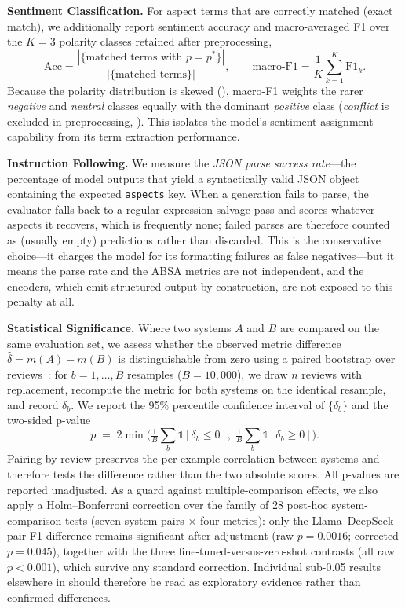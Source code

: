 \documentclass[bdcc,article,submit,moreauthors]{Definitions/mdpi}
\newcommand{\ind}{\mathds{1}} %
\begin{document}
\textbf{Sentiment Classification.} For aspect terms that are correctly matched (exact match), we additionally report sentiment accuracy and macro-averaged F1 over the $K{=}3$ polarity classes retained after preprocessing,
\begin{equation}
\label{eq:macrof1}
\mathrm{Acc} = \frac{|\{\text{matched terms with } p = p^{*}\}|}{|\{\text{matched terms}\}|},
\qquad
\text{macro-F1} = \frac{1}{K} \sum_{k=1}^{K} \mathrm{F1}_k .
\end{equation}
Because the polarity distribution is skewed (), macro-F1 weights the rarer \textit{negative} and \textit{neutral} classes equally with the dominant \textit{positive} class (\textit{conflict} is excluded in preprocessing, ). This isolates the model's sentiment assignment capability from its term extraction performance.

\textbf{Instruction Following.} We measure the \emph{JSON parse success rate}---the percentage of model outputs that yield a syntactically valid JSON object containing the expected \texttt{aspects} key. When a generation fails to parse, the evaluator falls back to a regular-expression salvage pass and scores whatever aspects it recovers, which is frequently none; failed parses are therefore counted as (usually empty) predictions rather than discarded. This is the conservative choice---it charges the model for its formatting failures as false negatives---but it means the parse rate and the ABSA metrics are not independent, and the encoders, which emit structured output by construction, are not exposed to this penalty at all.

\textbf{Statistical Significance.} Where two systems $A$ and $B$ are compared on the same evaluation set, we assess whether the observed metric difference $\hat{\delta} = m(A) - m(B)$ is distinguishable from zero using a paired bootstrap over reviews~\cite{koehn-2004-statistical}: for $b = 1, \dots, B$ resamples ($B = 10{,}000$), we draw $n$ reviews with replacement, recompute the metric for both systems on the identical resample, and record $\delta_b$. We report the 95\% percentile confidence interval of $\{\delta_b\}$ and the two-sided p-value
\begin{equation}
\label{eq:bootstrap}
p \;=\; 2 \min\!\Big( \tfrac{1}{B} \textstyle\sum_b \ind[\delta_b \leq 0],\; \tfrac{1}{B} \sum_b \ind[\delta_b \geq 0] \Big).
\end{equation}
Pairing by review preserves the per-example correlation between systems and therefore tests the difference rather than the two absolute scores. All p-values are reported unadjusted. As a guard against multiple-comparison effects, we also apply a Holm--Bonferroni correction over the family of 28 post-hoc system-comparison tests (seven system pairs $\times$ four metrics): only the Llama--DeepSeek pair-F1 difference remains significant after adjustment (raw $p{=}0.0016$; corrected $p{=}0.045$), together with the three fine-tuned-versus-zero-shot contrasts (all raw $p{<}0.001$), which survive any standard correction. Individual sub-0.05 results elsewhere in  should therefore be read as exploratory evidence rather than confirmed differences.
\end{document}

